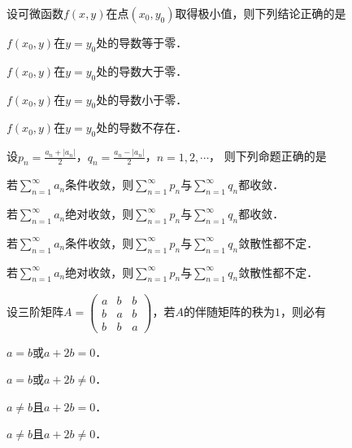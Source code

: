 \documentclass[plain,noanswer,medmath]{../../template/jnuexam}
\begin{document}
\begin{problem}
设可微函数$f(x,y)$在点$(x_0,y_0)$取得极小值，则下列结论正确的是\pickout{}
\begin{abcd}
\item $f(x_0,y)$在$y = y_0$处的导数等于零．
\item $f(x_0,y)$在$y = y_0$处的导数大于零．
\item $f(x_0,y)$在$y = y_0$处的导数小于零．
\item $f(x_0,y)$在$y = y_0$处的导数不存在．
\end{abcd}
\end{problem}


\begin{problem}
设$p_n = \frac{a_n + \left| a_n \right|}{2}$，$q_n = \frac{a_n - \left| a_n \right|}{2}$，$n = 1,2, \cdots$，
则下列命题正确的是\pickout{}
\begin{abcd}
\item 若$\sum_{n = 1}^{\infty}a_n$条件收敛，则$\sum_{n = 1}^{\infty}p_n$与$\sum_{n = 1}^{\infty}q_n$都收敛．
\item 若$\sum_{n = 1}^{\infty}a_n$绝对收敛，则$\sum_{n = 1}^{\infty}p_n$与$\sum_{n = 1}^{\infty}q_n$都收敛．
\item 若$\sum_{n = 1}^{\infty}a_n$条件收敛，则$\sum_{n = 1}^{\infty}p_n$与$\sum_{n = 1}^{\infty}q_n$敛散性都不定．
\item 若$\sum_{n = 1}^{\infty}a_n$绝对收敛，则$\sum_{n = 1}^{\infty}p_n$与$\sum_{n = 1}^{\infty}q_n$敛散性都不定．
\end{abcd}
\end{problem}


\begin{problem}
设三阶矩阵$A = \begin{pmatrix}
  a & b & b \\
  b & a & b \\
  b & b & a
\end{pmatrix}$，若$A$的伴随矩阵的秩为$1$，则必有\pickout{}
\begin{abcd}
\item $a = b$或$a + 2b = 0$．
\item $a = b$或$a + 2b \ne 0$．
\item $a \ne b$且$a + 2b = 0$．
\item $a \ne b$且$a + 2b \ne 0$．
\end{abcd}
\end{problem}
\end{document}
